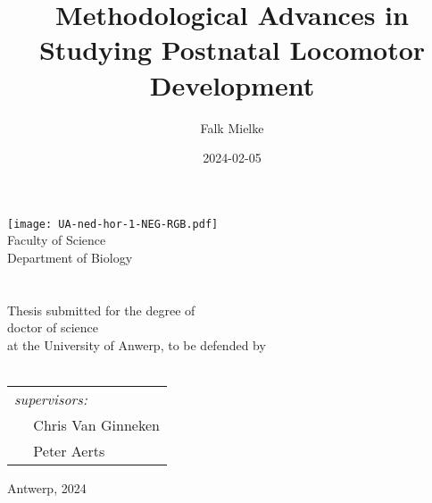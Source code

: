 \documentclass[12pt,twoside]{report}
\title{Methodological Advances \linebreak in \linebreak Studying Postnatal Locomotor Development}
\author{Falk Mielke}
\date{2024-02-05}
\newcommand{\setbackgroundcolour}{\pagecolor[rgb]{0.10,0.10,0.10}}
\newcommand{\settextcolour}{\color[rgb]{1.0,1.0,1.0}}
\newcommand{\invertbackgroundtext}{\setbackgroundcolour\settextcolour}
\begin{document}
\doublespacing
\makeatletter
    \begin{titlepage}  
    \invertbackgroundtext
    \begin{spacing}{2}
        \begin{center}
            {\texttt{[image: UA-ned-hor-1-NEG-RGB.pdf]}\\[4ex]}
            {\vspace*{-1.0cm} Faculty of Science \\ \vspace*{-0.4cm} Department of Biology}
            \ \vspace{1.5cm}\\
            {\LARGE \bfseries  \@title }\\[6ex]
            \ \vspace{1cm}\\
            Thesis submitted for the degree of 
            \\ doctor of science 
            \\ at the University of Anwerp, to be defended by
            {\\\large  \@author}\\[8ex]
        \end{center}
        \vspace*{\fill}
        \begin{flushleft}
            \begin{tabular}{ l}
              \textit{supervisors:}
               \\\(\quad\) Chris Van Ginneken
               \\\(\quad\) Peter Aerts
            \end{tabular}
        \end{flushleft}
        \vspace*{-1.55cm}
        \begin{flushright}
          Antwerp, 2024
        \end{flushright}
        \end{spacing}
    \end{titlepage}
\makeatother
\thispagestyle{empty}
\newpage
\end{document}
